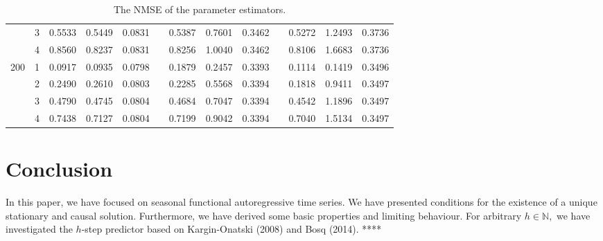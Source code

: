 \documentclass[11pt,a4paper]{article}
\numberwithin{equation}{section}
\begin{document}
\begin{table}
{\begin{tabular}{ccccccccccccc}
    & 3     & 0.5533 & 0.5449 & 0.0831 & & 0.5387 & 0.7601 & 0.3462 & & 0.5272 & 1.2493 & 0.3736\\
    & 4     & 0.8560 & 0.8237 & 0.0831 & & 0.8256 & 1.0040 & 0.3462 & & 0.8106 & 1.6683 & 0.3736\\ \hline
200 & 1     & 0.0917 & 0.0935 & 0.0798 & & 0.1879 & 0.2457 & 0.3393 & & 0.1114 & 0.1419 & 0.3496\\
    & 2     & 0.2490 & 0.2610 & 0.0803 & & 0.2285 & 0.5568 & 0.3394 & & 0.1818 & 0.9411 & 0.3497\\
    & 3     & 0.4790 & 0.4745 & 0.0804 & & 0.4684 & 0.7047 & 0.3394 & & 0.4542 & 1.1896 & 0.3497\\
    & 4     & 0.7438 & 0.7127 & 0.0804 & & 0.7199 & 0.9042 & 0.3394 & & 0.7040 & 1.5134 & 0.3497\\ \hline
\end{tabular}
} %
\caption{The NMSE of the parameter estimators. \label{tab: sim}}
\end{table}

\section{Conclusion}\label{sec:conclusion}

In this paper, we have focused on seasonal functional autoregressive time series. We have presented conditions for the existence of a unique stationary and causal solution. Furthermore, we have derived some basic properties and limiting behaviour. For arbitrary $h\in {\mathbb{N}},$ we have investigated the $h$-step  predictor based on Kargin-Onatski (2008) and Bosq (2014). ****


\printbibliography
\end{document}
